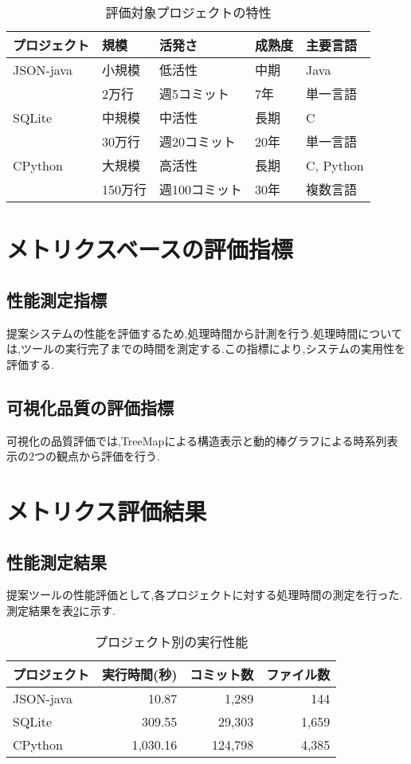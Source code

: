 \documentclass[12pt,twoside]{jbook}
\begin{document}
\begin{table}[htb]
\caption{評価対象プロジェクトの特性}
\label{tab:project-characteristics}
\begin{center}
\begin{tabular}{lllll}
\hline
プロジェクト & 規模 & 活発さ & 成熟度 & 主要言語 \\
\hline
JSON-java & 小規模 & 低活性 & 中期 & Java \\
 & 2万行 & 週5コミット & 7年 & 単一言語 \\
\hline
SQLite & 中規模 & 中活性 & 長期 & C \\
 & 30万行 & 週20コミット & 20年 & 単一言語 \\
\hline
CPython & 大規模 & 高活性 & 長期 & C, Python \\
 & 150万行 & 週100コミット & 30年 & 複数言語 \\
\hline

\end{tabular}
\end{center}
\end{table}

\section{メトリクスベースの評価指標}
\subsection{性能測定指標}
提案システムの性能を評価するため,処理時間から計測を行う.処理時間については,ツールの実行完了までの時間を測定する.この指標により,システムの実用性を評価する.
\subsection{可視化品質の評価指標}
可視化の品質評価では,TreeMapによる構造表示と動的棒グラフによる時系列表示の2つの観点から評価を行う.
\section{メトリクス評価結果}
\subsection{性能測定結果}
提案ツールの性能評価として,各プロジェクトに対する処理時間の測定を行った.測定結果を表\ref{tab:performance-results}に示す.

\begin{table}[htb]
\caption{プロジェクト別の実行性能}
\label{tab:performance-results}
\begin{center}
\begin{tabular}{lrrr}
\hline
プロジェクト & 実行時間(秒) & コミット数 & ファイル数 \\
\hline
JSON-java & 10.87 & 1,289 & 144 \\
SQLite & 309.55 & 29,303 & 1,659 \\
CPython & 1,030.16 & 124,798 & 4,385 \\
\hline
\end{tabular}
\end{center}
\end{table}
\end{document}
